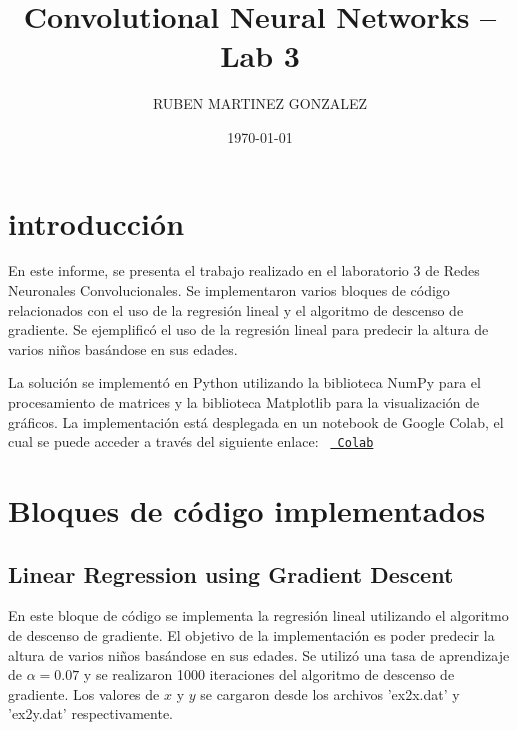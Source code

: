\documentclass{article}
\title{Convolutional Neural Networks – Lab 3}
\author{RUBEN MARTINEZ GONZALEZ}
\date{\today}
\begin{document}
    \maketitle


    \section{introducción}\label{sec:introduccion}
    En este informe, se presenta el trabajo realizado en el laboratorio 3 de Redes Neuronales Convolucionales.
    Se implementaron varios bloques de código relacionados con el uso de la regresión lineal y el algoritmo de descenso de gradiente.
    Se ejemplificó el uso de la regresión lineal para predecir la altura de varios niños basándose en sus edades.

    \noindent
    La solución se implementó en Python utilizando la biblioteca NumPy para el procesamiento de matrices y la biblioteca Matplotlib para la visualización de gráficos.
    La implementación está desplegada en un notebook de Google Colab, el cual se puede acceder a través del siguiente enlace:
    \texttt{%
        \href{https://colab.research.google.com/drive/1IFRzG-mP11zXdN0VYB03V_xetrp3XHkX?usp=sharing}{%
            Colab}%
    }


    \section{Bloques de código implementados}\label{sec:bloques-de-codigo-implementados}

    \subsection{Linear Regression using Gradient Descent}\label{subsec:Gradient-Descent}
    \noindent
    En este bloque de código se implementa la regresión lineal utilizando el algoritmo de descenso de gradiente.
    El objetivo de la implementación es poder predecir la altura de varios niños basándose en sus edades.
    Se utilizó una tasa de aprendizaje de $\alpha = 0.07$ y se realizaron 1000 iteraciones del algoritmo de descenso de gradiente.
    Los valores de $x$ y $y$ se cargaron desde los archivos 'ex2x.dat' y 'ex2y.dat' respectivamente.
\end{document}
